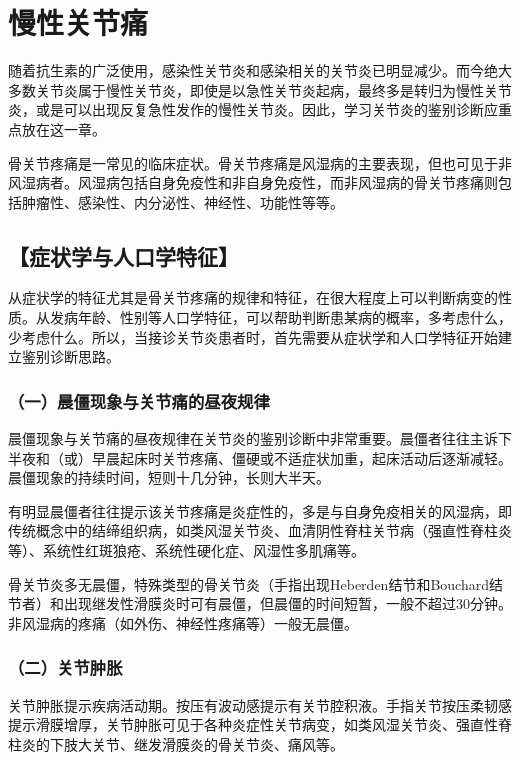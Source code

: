 \chapter{慢性关节痛}

随着抗生素的广泛使用，感染性关节炎和感染相关的关节炎已明显减少。而今绝大多数关节炎属于慢性关节炎，即使是以急性关节炎起病，最终多是转归为慢性关节炎，或是可以出现反复急性发作的慢性关节炎。因此，学习关节炎的鉴别诊断应重点放在这一章。

骨关节疼痛是一常见的临床症状。骨关节疼痛是风湿病的主要表现，但也可见于非风湿病者。风湿病包括自身免疫性和非自身免疫性，而非风湿病的骨关节疼痛则包括肿瘤性、感染性、内分泌性、神经性、功能性等等。

\section{【症状学与人口学特征】}

从症状学的特征尤其是骨关节疼痛的规律和特征，在很大程度上可以判断病变的性质。从发病年龄、性别等人口学特征，可以帮助判断患某病的概率，多考虑什么，少考虑什么。所以，当接诊关节炎患者时，首先需要从症状学和人口学特征开始建立鉴别诊断思路。

\subsection{（一）晨僵现象与关节痛的昼夜规律}

晨僵现象与关节痛的昼夜规律在关节炎的鉴别诊断中非常重要。晨僵者往往主诉下半夜和（或）早晨起床时关节疼痛、僵硬或不适症状加重，起床活动后逐渐减轻。晨僵现象的持续时间，短则十几分钟，长则大半天。

有明显晨僵者往往提示该关节疼痛是炎症性的，多是与自身免疫相关的风湿病，即传统概念中的结缔组织病，如类风湿关节炎、血清阴性脊柱关节病（强直性脊柱炎等）、系统性红斑狼疮、系统性硬化症、风湿性多肌痛等。

骨关节炎多无晨僵，特殊类型的骨关节炎（手指出现Heberden结节和Bouchard结节者）和出现继发性滑膜炎时可有晨僵，但晨僵的时间短暂，一般不超过30分钟。非风湿病的疼痛（如外伤、神经性疼痛等）一般无晨僵。

\subsection{（二）关节肿胀}

关节肿胀提示疾病活动期。按压有波动感提示有关节腔积液。手指关节按压柔韧感提示滑膜增厚，关节肿胀可见于各种炎症性关节病变，如类风湿关节炎、强直性脊柱炎的下肢大关节、继发滑膜炎的骨关节炎、痛风等。

